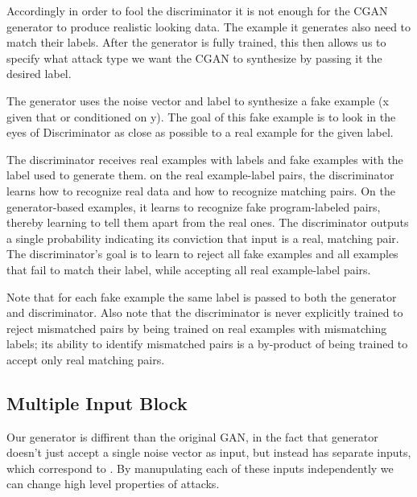  Accordingly in order to fool the discriminator it is not enough for the CGAN generator to produce realistic looking data. The example it generates also need to match their labels. After the generator is fully trained, this then allows us to specify what attack type we want the CGAN to synthesize by passing it the desired label. 
 
 The generator uses the noise vector and label to synthesize a fake example (x given that or conditioned on y). The goal of this fake example is to look in the eyes of Discriminator as close as possible to a real example for the given label.  
 
 
 
 The discriminator receives real examples with labels and fake examples with the label used to generate them. on the real example-label pairs, the discriminator learns how to recognize real data and how to recognize matching pairs. On the generator-based examples, it learns to recognize fake program-labeled pairs, thereby learning to tell them apart from the real ones. The discriminator outputs a single probability indicating its conviction that input is a real, matching pair. The discriminator's goal is to learn to reject all fake examples and all examples that fail to match their label, while accepting all real example-label pairs. 
 
 Note that for each fake example the same label is passed to both the generator and discriminator. Also note that the discriminator is never explicitly trained to reject mismatched pairs by being trained on real examples with mismatching labels; its ability to identify mismatched pairs is a by-product of being trained to accept only real matching pairs. 
 
 
 \subsection{Multiple Input Block}
 
 Our generator is diffirent than the original GAN, in the fact that generator doesn't just accept a single noise vector as input, but instead has  separate inputs, which correspond to . By manupulating each of these inputs independently we can change high level properties of attacks. 
 
 
 
 
 
 
 
 






